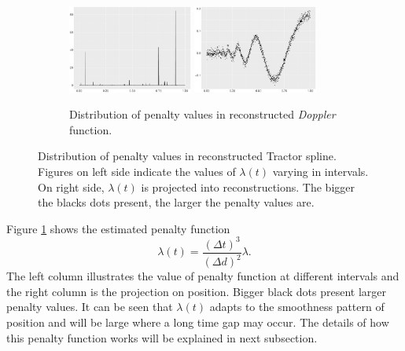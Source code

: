 \begin{figure}\ContinuedFloat
    \centering 
    \begin{subfigure}{\textwidth}
    \centering
    \includegraphics[width=0.45\textwidth]{Chapters/02TractorSplineTheory/plot/ggplot/ggDopplerPenaltyBar.pdf}
    \includegraphics[width=0.45\textwidth]{Chapters/02TractorSplineTheory/plot/ggplot/ggDopplerPenaltyLine.pdf}
    \caption{Distribution of penalty values in reconstructed \textit{Doppler} function.}
    \end{subfigure}
\caption{Distribution of penalty values in reconstructed Tractor spline. Figures on left side indicate the values of $\lambda(t)$ varying in intervals. On right side, $\lambda(t)$ is projected into reconstructions. The bigger the blacks dots present, the larger the penalty values are.}\label{numpenalty}
 \end{figure}


Figure \ref{numpenalty} shows the estimated penalty function
\begin{equation}
\lambda(t)=\frac{(\Delta t)^3}{(\Delta d)^2}\lambda.
\end{equation}
The left column illustrates the value of penalty function at different intervals and the right column is the projection on position. Bigger black dots present larger penalty values. It can be seen that $\lambda(t)$ adapts to the smoothness pattern of position and will be large where a long time gap may occur. The details of how this penalty function works will be explained in next subsection.



